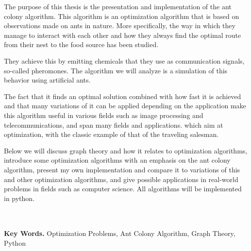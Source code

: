 {\latintext
\begin{center}
{}
\end{center}
{\small
	{\lt The purpose of this thesis is the presentation and implementation of the ant colony algorithm. This algorithm is an optimization algorithm that is based on observations made on ants in nature. More specifically, the way in which they manage to interact with each other and how they always find the optimal route from their nest to the food source has been studied.

  They achieve this by emitting chemicals that they use as communication signals, so-called pheromones. The algorithm we will analyze is a simulation of this behavior using artificial ants.
 
 The fact that it finds an optimal solution combined with how fast it is achieved and that many variations of it can be applied depending on the application make this algorithm useful in various fields such as image processing and telecommunications, and span many fields and applications. which aim at optimization, with the classic example of that of the traveling salesman.

Below we will discuss graph theory and how it relates to optimization algorithms, introduce some optimization algorithms with an emphasis on the ant colony algorithm, present my own implementation and compare it to variations of this and other optimization algorithms, and give possible applications in real-world problems in fields such as computer science. All algorithms will be implemented in python.}
	\ \\\\
{\bf Key Words.} Οptimization Problems, Ant Colony Algorithm, Graph Theory, Python
}}
